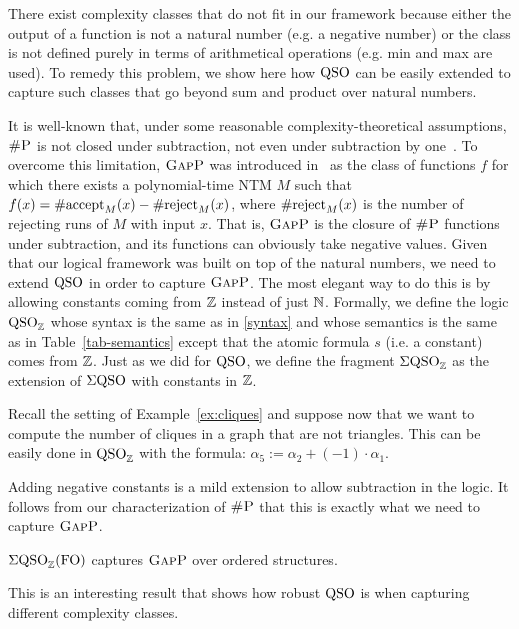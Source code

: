 
There exist complexity classes that do not fit in our framework because either the output of a function is not a natural number (e.g. a negative number) or the class is not defined purely in terms of arithmetical operations (e.g. min and max are used).
To remedy this problem, we show here how ${\rm QSO}$ can be easily extended to capture such classes that go beyond sum and product over natural numbers. 

It is well-known that, under some reasonable complexity-theoretical assumptions, $\text{\sc \#P}$ is not closed under subtraction, not even under subtraction by one~\cite{OH93}.
To overcome this limitation, $\text{\sc GapP}$ was introduced in~\cite{FFK94} as the class of functions $f$ for which there exists a polynomial-time NTM $M$ such that $f(x) = \text{\rm \#accept}_M(x) - \text{\rm \#reject}_M(x)$, where  $\text{\rm \#reject}_M(x)$ is the number of rejecting runs of $M$ with input $x$.
That is, $\text{\sc GapP}$ is the closure of $\text{\sc \#P}$ functions under subtraction, and its functions can obviously take negative values.
Given that our logical framework was built on top of the natural numbers, we need to extend ${\rm QSO}$ in order to %
capture $\text{\sc GapP}$. 
The most elegant way to do this is by allowing constants coming from $\mathbb{Z}$ instead of just $\mathbb{N}$. 
Formally, we define the logic ${\rm QSO}_{\mathbb{Z}}$ whose syntax is the same as in \eqref{syntax} and whose semantics is the same as in Table~\ref{tab-semantics} except that the atomic formula $s$ (i.e. a constant) comes from $\mathbb{Z}$.  
Just as we did for ${\rm QSO}$, we define the fragment $\Sigma{\rm QSO}_{\mathbb{Z}}$ as the extension of $\Sigma{\rm QSO}$ with constants in $\mathbb{Z}$.
\begin{example}
	Recall the setting of Example~\ref{ex:cliques} and suppose now that we want to compute the number of cliques in a graph that are not triangles. This can be easily done in ${\rm QSO}_{\mathbb{Z}}$ with the formula:
	$
	\alpha_5 :=	\alpha_2 + (-1) \cdot \alpha_1 
	$.
\end{example}
Adding negative constants is a mild extension to allow subtraction in the logic. 
It follows from our characterization of $\text{\sc \#P}$ that this is exactly what we need to capture  $\text{\sc GapP}$.
\begin{corollary} \label{prop:capture-gapp}
	$\Sigma{\rm QSO}_{\mathbb{Z}}({\rm FO})$ captures $\text{\sc GapP}$ over ordered structures.
\end{corollary}
This is an interesting result that shows how robust ${\rm QSO}$ is when capturing different complexity classes.

